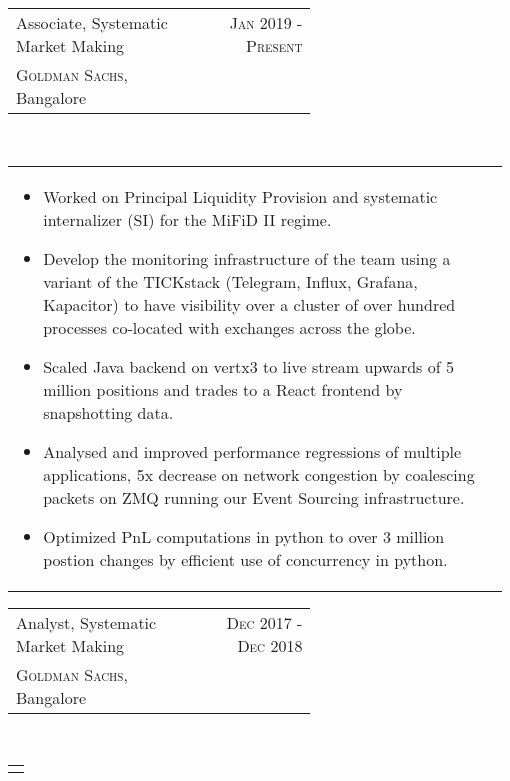 \documentclass[a4paper]{article} %
\newcommand{\verticalspacing}{-0.25cm}
\newcommand{\bulletspace}{0.7cm}
\newcommand{\projectheadspacing}{6.9cm}
\newcommand{\cproject}[5]{%
    \begin{tabular}{p{0.60\linewidth}r}
        \textcolor{NavyBlue}{\small #2} & \multicolumn{1}{m{ \projectheadspacing{} }}{\raggedleft \small {\textsc{#1}}}\\
        \small {#3} & \small {#4}
    \end{tabular}\\
    \begin{tabular}{p{0.98\linewidth}}
    \vspace{-0.3cm}
        \small{#5}
    \end{tabular}
    \vspace{\verticalspacing{}}
}
\begin{document}
\cproject
      {Jan 2019 - Present}
      {Associate, Systematic Market Making}
      {\textsc{Goldman Sachs}, Bangalore}
      {}
      {%
        \begin{itemize}[leftmargin=\bulletspace{}]
          \item Worked on Principal Liquidity Provision and systematic internalizer (SI) for the MiFiD II regime.
          \item Develop the monitoring infrastructure of the team using a variant of the TICKstack
              (Telegram, Influx, Grafana, Kapacitor) to have visibility over a cluster of over hundred
              processes co-located with exchanges across the globe.
          \item Scaled Java backend on vertx3 to live stream upwards of 5 million positions
              and trades to a React frontend by snapshotting data.
          \item Analysed and improved performance regressions of multiple applications,
              5x decrease on network congestion by coalescing packets on ZMQ running our Event Sourcing
              infrastructure.
          \item Optimized PnL computations in python to over 3 million postion changes by efficient
              use of concurrency in python.
        \end{itemize}
      }

\cproject
      {Dec 2017 - Dec 2018}
      {Analyst, Systematic Market Making}
      {\textsc{Goldman Sachs}, Bangalore}
      {}
      {%
      }
\end{document}
